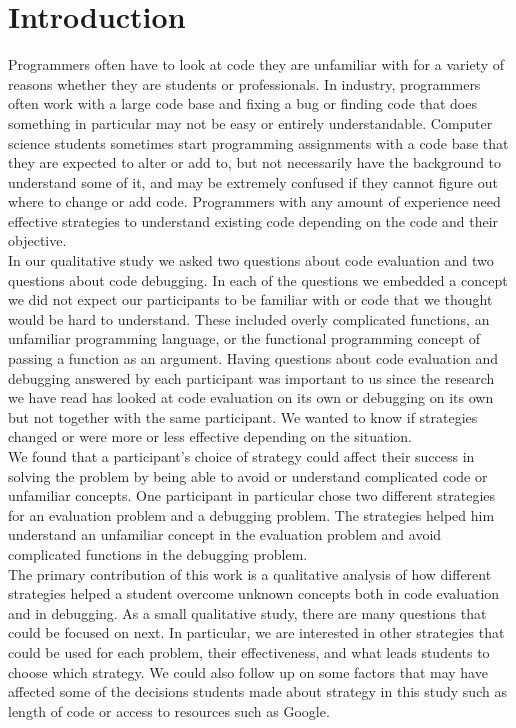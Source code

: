 \section{Introduction}

Programmers often have to look at code they are unfamiliar with for a variety of reasons whether they are students or professionals.
In industry, programmers often work with a large code base and fixing a bug or finding code that does something in particular may not be easy or entirely understandable.
Computer science students sometimes start programming assignments with a code base that they are expected to alter or add to, but not necessarily have the background to understand some of it, and may be extremely confused if they cannot figure out where to change or add code.
Programmers with any amount of experience need effective strategies to understand existing code depending on the code and their objective. \\

In our qualitative study we asked two questions about code evaluation and two questions about code debugging.
In each of the questions we embedded a concept we did not expect our participants to be familiar with or code that we thought would be hard to understand.
These included overly complicated functions, an unfamiliar programming language, or the functional programming concept of passing a function as an argument.
Having questions about code evaluation and debugging answered by each participant was important to us since the research we have read has looked at code evaluation on its own or debugging on its own but not together with the same participant.
We wanted to know if strategies changed or were more or less effective depending on the situation. \\

We found that a participant's choice of strategy could affect their success in solving the problem by being able to avoid or understand complicated code or unfamiliar concepts.
One participant in particular chose two different strategies for an evaluation problem and a debugging problem.
The strategies helped him understand an unfamiliar concept in the evaluation problem and avoid complicated functions in the debugging problem. \\

The primary contribution of this work is a qualitative analysis of how different strategies helped a student overcome unknown concepts both in code evaluation and in debugging.
As a small qualitative study, there are many questions that could be focused on next.
In particular, we are interested in other strategies that could be used for each problem, their effectiveness, and what leads students to choose which strategy.
We could also follow up on some factors that may have affected some of the decisions students made about strategy in this study such as length of code or access to resources such as Google.\\

\newpage